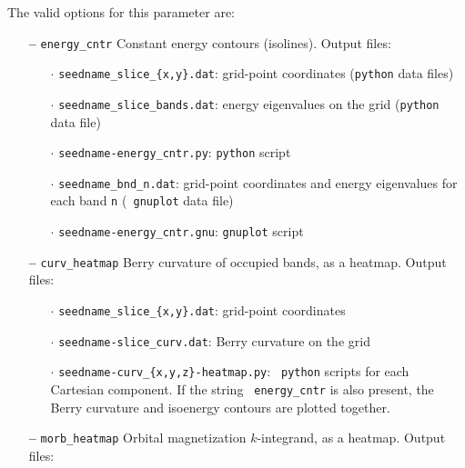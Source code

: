 The valid options for this parameter are:
\begin{itemize}

\item[{\bf --}] \verb#energy_cntr# Constant energy contours
  (isolines). Output files:

  \begin{itemize}

  \item[$\cdot$] {\tt seedname\_slice\_\{x,y\}.dat}: grid-point
    coordinates ({\tt python} data files)

  \item[$\cdot$] {\tt seedname\_slice\_bands.dat}: energy eigenvalues
    on the grid ({\tt python} data file)

  \item[$\cdot$] {\tt seedname-energy\_cntr.py}: {\tt python} script

  \item[$\cdot$] {\tt seedname\_bnd\_n.dat}: grid-point coordinates
    and energy eigenvalues for each band {\tt n} ({\tt
      gnuplot} data file)

  \item[$\cdot$] {\tt seedname-energy\_cntr.gnu}: {\tt gnuplot} script

  \end{itemize}

\item[{\bf --}] \verb#curv_heatmap# Berry curvature of occupied bands,
  as a heatmap. Output files:

  \begin{itemize}

  \item[$\cdot$] {\tt seedname\_slice\_\{x,y\}.dat}: grid-point coordinates 
    
  \item[$\cdot$] {\tt seedname-slice\_curv.dat}: Berry curvature 
    on the grid
    
  \item[$\cdot$] {\tt seedname-curv\_\{x,y,z\}-heatmap.py}: {\tt
      python} scripts for each Cartesian component. If the string {\tt
      energy\_cntr} is also present, the Berry curvature and isoenergy
    contours are plotted together.
    
  \end{itemize}

\item[{\bf --}] \verb#morb_heatmap# Orbital magnetization
  $k$-integrand, as a heatmap. Output files:


\end{itemize}
